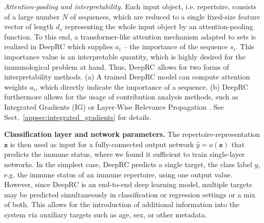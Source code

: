 \documentclass[oneside]{book}
\newcommand\Bz{\bm{z}}
\begin{document}
\textit{Attention-pooling and interpretability.}
Each input object, i.e. repertoire, consists of a large 
number $N$ of sequences,
which are reduced to a single fixed-size feature vector of length $d_v$ 
representing the whole input object by an attention-pooling function. 
To this end, a transformer-like attention 
mechanism adapted to sets is realized in DeepRC which supplies $a_i$ -- the importance of 
the sequence $s_i$. This importance value is an interpretable quantity, 
which is highly desired for the immunological problem at hand. 
Thus, DeepRC allows for two forms of interpretability methods.
(a) A trained DeepRC model can compute attention weights $a_i$,
which directly indicate the importance of a sequence.
(b) DeepRC furthermore allows for the usage of contribution analysis 
methods, such as Integrated Gradients (IG) 
\citep{sundararajan2017axiomatic} or Layer-Wise Relevance 
Propagation \citep{montavon2018methods,arras2019explaining}. See Sect.~\ref{appsec:integrated_gradients} for details.
%



\textbf{Classification layer and network parameters.} 
%
The repertoire-representation $\Bz$ is then 
used as input for a fully-connected output network 
$\hat y= o(\Bz)$ that predicts the immune status, 
where we found it sufficient to train single-layer networks.
%
In the simplest case, DeepRC predicts a single target, the class label $y$,
e.g. the immune status of an immune repertoire,
using one output value.
%
However, since DeepRC is an end-to-end deep learning model, multiple 
targets may be predicted simultaneously in classification or 
regression settings or a mix of both.
This allows for the introduction of additional information into the 
system via auxiliary targets such as age, sex, or other metadata.
\end{document}
